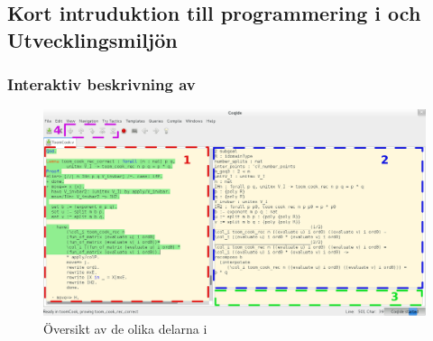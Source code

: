 \subsection{Kort intruduktion till programmering i \coq och
Utvecklingsmiljön \coqIde}


\subsubsection{Interaktiv beskrivning av \coqIde}


\begin{figure}[h!]
  \centering
  \includegraphics[width=150mm]{../images/Overview}
  \caption[Översikt av \coqIde]
   {Översikt av de olika delarna i \coqIde}
\end{figure}


